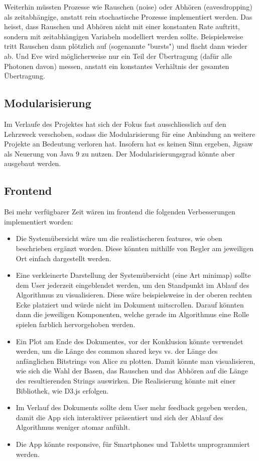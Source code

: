 \documentclass[a4paper,10.2pt,pdftex]{scrartcl}%
\begin{document}
Weiterhin müssten Prozesse wie Rauschen (noise) oder Abhören (eavesdropping) als zeitabhängige, anstatt rein stochastische Prozesse implementiert werden. Das heisst, dass Rauschen und Abhören nicht mit einer konstanten Rate auftritt, sondern mit zeitabhängigen Variabeln modelliert werden sollte. Beispielsweise tritt Rauschen dann plötzlich auf (sogenannte "bursts") und flacht dann wieder ab. Und Eve wird möglicherweise nur ein Teil der Übertragung (dafür alle Photonen davon) messen, anstatt ein konstantes Verhältnis der gesamten Übertragung.

\subsection{Modularisierung}
Im Verlaufe des Projektes hat sich der Fokus fast ausschliesslich auf den Lehrzweck verschoben, sodass die Modularisierung für eine Anbindung an weitere Projekte an Bedeutung verloren hat. Insofern hat es keinen Sinn ergeben, Jigsaw als Neuerung von Java 9 zu nutzen. Der Modularisierungsgrad könnte aber ausgebaut werden. 


\subsection{Frontend}
Bei mehr verfügbarer Zeit wären im frontend die folgenden Verbesserungen implementiert worden:
\begin{itemize}
\item Die Systemübersicht wäre um die realistischeren features, wie oben beschrieben ergänzt worden. Diese könnten mithilfe von Regler am jeweiligen Ort einfach dargestellt werden.
\item Eine verkleinerte Darstellung der Systemübersicht (eine Art minimap) sollte dem User jederzeit eingeblendet werden, um den Standpunkt im Ablauf des Algorithmus zu visualisieren. Diese wäre beispielsweise in der oberen rechten Ecke platziert und würde nicht im Dokument mitscrollen. Darauf könnten dann die jeweiligen Komponenten, welche gerade im Algorithmus eine Rolle spielen farblich hervorgehoben werden.
\item Ein Plot am Ende des Dokumentes, vor der Konklusion könnte verwendet werden, um die Länge des common shared keys vs. der Länge des anfänglichen Bitstrings von Alice zu plotten. Damit könnte man visualisieren, wie sich die Wahl der Basen, das Rauschen und das Abhören auf die Länge des resultierenden Strings auswirken. Die Realisierung könnte mit einer Bibliothek, wie D3.js erfolgen.
\item Im Verlauf des Dokuments sollte dem User mehr feedback gegeben werden, damit die App sich interaktiver präsentiert und sich der Ablauf des Algorithmus weniger atomar anfühlt.
\item Die App könnte responsive, für Smartphones und Tabletts umprogrammiert werden.
\end{itemize}


\newpage
\nocite{*}	

 


\appendix




\end{document}
